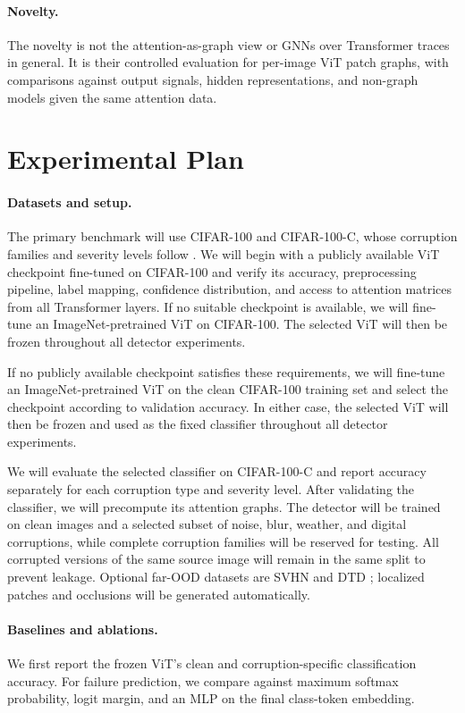 \paragraph{Novelty.}
The novelty is not the attention-as-graph view or GNNs over
Transformer traces in general. It is their controlled evaluation for
per-image ViT patch graphs, with comparisons against output signals,
hidden representations, and non-graph models given the same attention
data.

\section{Experimental Plan}

\paragraph{Datasets and setup.}
The primary benchmark will use CIFAR-100 and CIFAR-100-C, whose
corruption families and severity levels follow
\citet{hendrycks2019benchmarking}. We will begin with a publicly available ViT checkpoint fine-tuned on
CIFAR-100 and verify its accuracy, preprocessing pipeline, label
mapping, confidence distribution, and access to attention matrices from
all Transformer layers. If no suitable checkpoint is available, we
will fine-tune an ImageNet-pretrained ViT on CIFAR-100. The selected
ViT will then be frozen throughout all detector experiments.

If no publicly available checkpoint satisfies these requirements, we
will fine-tune an ImageNet-pretrained ViT on the clean CIFAR-100 training
set and select the checkpoint according to validation accuracy. In
either case, the selected ViT will then be frozen and used as the fixed
classifier throughout all detector experiments.

We will evaluate the selected classifier on CIFAR-100-C and report
accuracy separately for each corruption type and severity level. After
validating the classifier, we will precompute its attention graphs. The
detector will be trained on clean images and a selected subset of noise,
blur, weather, and digital corruptions, while complete corruption
families will be reserved for testing. All corrupted versions of the
same source image will remain in the same split to prevent leakage.
Optional far-OOD datasets are SVHN \citep{netzer2011svhn} and DTD
\citep{cimpoi2014describing}; localized patches and occlusions will be
generated automatically.


\paragraph{Baselines and ablations.}
We first report the frozen ViT's clean and corruption-specific
classification accuracy. For failure prediction, we compare against
maximum softmax probability, logit margin, and an MLP on the final
class-token embedding.

